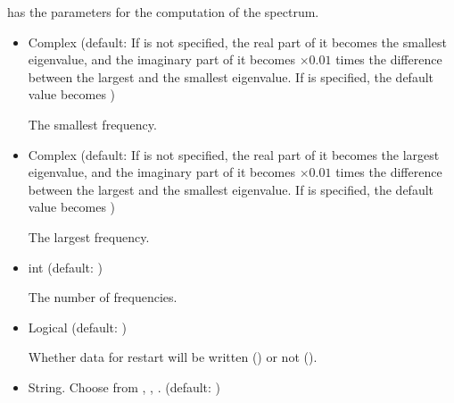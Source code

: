 \documentclass[letterpaper,10pt,dvipdfmx,openany,english]{sphinxmanual}
\begin{document}
 has the parameters for the computation of the spectrum.
\begin{itemize}
\item {} 

 Complex (default: If  is not specified,
the real part of it becomes the smallest eigenvalue,
and the imaginary part of it becomes \(\times0.01\) times
the difference between the largest\sphinxhyphen{} and the smallest\sphinxhyphen{} eigenvalue.
If  is specified, the default value becomes )

 The smallest frequency.

\item {} 

 Complex (default: If  is not specified,
the real part of it becomes the largest eigenvalue,
and the imaginary part of it becomes \(\times0.01\) times
the difference between the largest\sphinxhyphen{} and the smallest\sphinxhyphen{} eigenvalue.
If  is specified, the default value becomes )

 The largest frequency.

\item {} 

 int (default: )

 The number of frequencies.

\item {} 

 Logical (default: )

Whether data for restart will be written () or not ().

\item {} 

String.  Choose from , , .
(default: )


\end{itemize}
\end{document}
